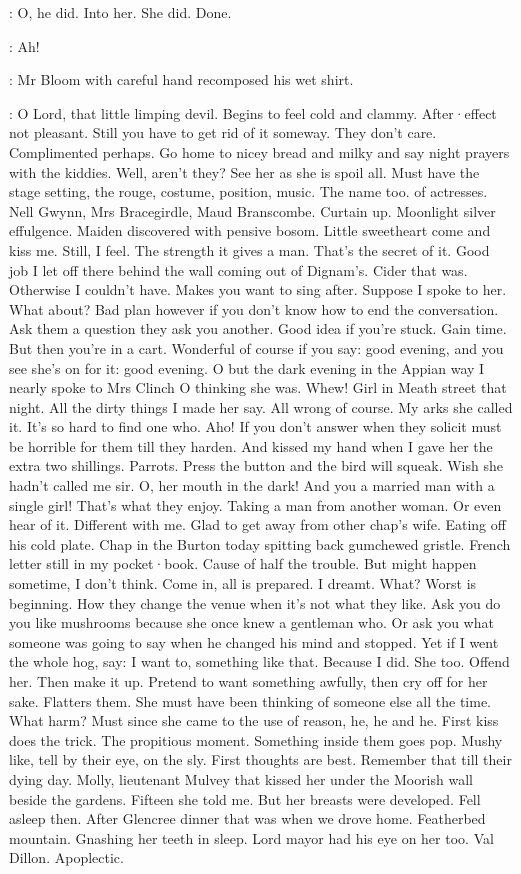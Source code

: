 :
O,
he did.
Into her.
She did.
Done.

\Bloom:
Ah!

:
Mr Bloom with careful hand recomposed his wet shirt.

\Bloom:
O Lord,
that little
limping devil.
Begins to feel cold and clammy.
After·effect not pleasant.
Still you have to get rid of it someway.
They don't care.
Complimented
perhaps.
Go home to nicey bread and milky and say night prayers with the
kiddies.
Well,
aren't they?
See her as she is spoil all.
Must have the
stage setting,
the rouge,
costume,
position,
music.
The name too.
of actresses.
Nell Gwynn,
Mrs Bracegirdle,
Maud Branscombe.
Curtain up.
Moonlight silver effulgence.
Maiden discovered with pensive bosom.
Little sweetheart
come and kiss me.
Still,
I feel.
The strength it gives a man.
That's the secret of it.
Good job I let off there behind the wall coming
out of Dignam's.
Cider that was.
Otherwise I couldn't have.
Makes you want
to sing after.
Suppose I spoke to her.
What about?
Bad plan however if you don't know how to end the conversation.
Ask them a
question they ask you another.
Good idea if you're stuck.
Gain time.
But
then you're in a cart.
Wonderful of course if you say:
good evening,
and
you see she's on for it:
good evening.
O but the dark evening in the
Appian way I nearly spoke to Mrs Clinch O thinking she was.
Whew!
Girl in
Meath street that night.
All the dirty things I made her say.
All wrong of
course.
My arks she called it.
It's so hard to find one who.
Aho!
If you don't answer
when they solicit
must be horrible for them
till they harden.
And kissed my hand when I gave her the extra two shillings.
Parrots.
Press
the button and the bird will squeak.
Wish she hadn't called me sir.
O,
her
mouth in the dark!
And you a married man with a single girl!
That's what
they enjoy.
Taking a man from another woman.
Or even hear of it.
Different with me.
Glad to get away from other chap's wife.
Eating off his
cold plate.
Chap in the Burton today spitting back gumchewed gristle.
French letter still in my pocket·book.
Cause of half the trouble.
But might
happen sometime,
I don't think.
Come in,
all is prepared.
I dreamt.
What?
Worst is beginning.
How they change the venue when it's not what they like.
Ask you
do you like mushrooms
because she once knew a gentleman
who.
Or ask you what someone was going to say when he changed his
mind and stopped.
Yet if I went the whole hog,
say:
I want to,
something
like that.
Because I did.
She too.
Offend her.
Then make it up.
Pretend to
want something awfully,
then cry off for her sake.
Flatters them.
She must
have been thinking of someone else all the time.
What harm?
Must since she
came to the use of reason,
he,
he and he.
First kiss does the trick.
The
propitious moment.
Something inside them goes pop.
Mushy like,
tell by
their eye,
on the sly.
First thoughts are best.
Remember that till their
dying day.
Molly,
lieutenant Mulvey that kissed her
under the Moorish wall
beside the gardens.
Fifteen she told me.
But her breasts were developed.
Fell asleep then.
After Glencree dinner that was when we drove home.
Featherbed mountain.
Gnashing her teeth in sleep.
Lord mayor had his eye
on her too.
Val Dillon.
Apoplectic.


